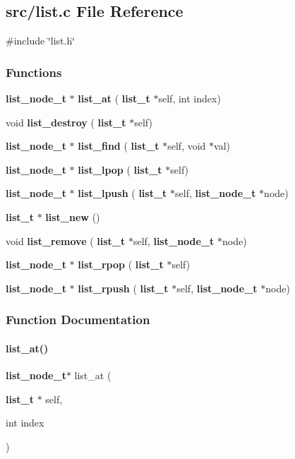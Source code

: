 \subsection{src/list.c File Reference}
\label{a00110}
{\ttfamily \#include \char`\"{}list.\+h\char`\"{}}\newline
\subsubsection*{Functions}
\begin{DoxyCompactItemize}
\item 
\textbf{ list\+\_\+node\+\_\+t} $\ast$ \textbf{ list\+\_\+at} (\textbf{ list\+\_\+t} $\ast$self, int index)
\item 
void \textbf{ list\+\_\+destroy} (\textbf{ list\+\_\+t} $\ast$self)
\item 
\textbf{ list\+\_\+node\+\_\+t} $\ast$ \textbf{ list\+\_\+find} (\textbf{ list\+\_\+t} $\ast$self, void $\ast$val)
\item 
\textbf{ list\+\_\+node\+\_\+t} $\ast$ \textbf{ list\+\_\+lpop} (\textbf{ list\+\_\+t} $\ast$self)
\item 
\textbf{ list\+\_\+node\+\_\+t} $\ast$ \textbf{ list\+\_\+lpush} (\textbf{ list\+\_\+t} $\ast$self, \textbf{ list\+\_\+node\+\_\+t} $\ast$node)
\item 
\textbf{ list\+\_\+t} $\ast$ \textbf{ list\+\_\+new} ()
\item 
void \textbf{ list\+\_\+remove} (\textbf{ list\+\_\+t} $\ast$self, \textbf{ list\+\_\+node\+\_\+t} $\ast$node)
\item 
\textbf{ list\+\_\+node\+\_\+t} $\ast$ \textbf{ list\+\_\+rpop} (\textbf{ list\+\_\+t} $\ast$self)
\item 
\textbf{ list\+\_\+node\+\_\+t} $\ast$ \textbf{ list\+\_\+rpush} (\textbf{ list\+\_\+t} $\ast$self, \textbf{ list\+\_\+node\+\_\+t} $\ast$node)
\end{DoxyCompactItemize}


\subsubsection{Function Documentation}
\mbox{\label{a00110_ab3dacc64ceb63b0a0849312b0a14c91c}} 
\paragraph{list\+\_\+at()}
{\footnotesize\ttfamily \textbf{ list\+\_\+node\+\_\+t}$\ast$ list\+\_\+at (\begin{DoxyParamCaption}\item[{\textbf{ list\+\_\+t} $\ast$}]{self,  }\item[{int}]{index }\end{DoxyParamCaption})}




